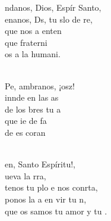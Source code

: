 \begin{cancion}%
	ndanos, Dios, Espír Santo,\\
	enanos, Ds, tu slo de re, \\
	que nos a enten\\
	que  fraterni\\
	os a la humani.\\\jump\\
	\begin{chorus}%
	Pe, ambranos, ¡osz! \\
	innde en las as\\
	de los bres tu a\\
	que ie de fa\\
	de es coran\\
	\end{chorus}%
	\jump\\
	en, Santo Espíritu!, \\
	ueva la rra,\\
	tenos tu plo e nos conrta, \\
	ponos la a en vir tu n,\\
	que os samos tu amor y tu .\\
\end{cancion}%
